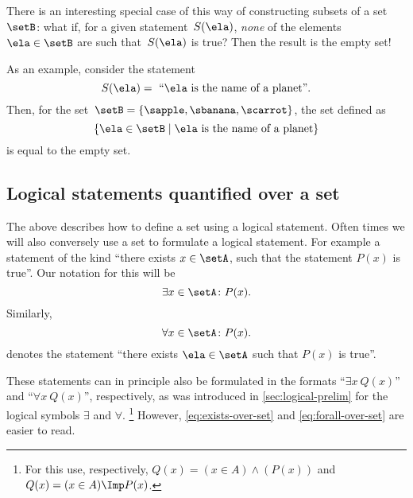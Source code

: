 There is an interesting special case of this way of constructing subsets of a set~$\setB$:
what if, for a given statement~$S(\ela)$, \emph{none} of the elements~$\ela \in \setB$ are such that~$S(\ela)$ is true?
Then the result is the empty set!

As an example, consider the statement
%
\begin{equation*}
    S(\ela) =\text{ ``} \ela \text{ is the name of a planet''}.
\end{equation*}
%
Then, for the set~$\setB = \{ \sapple, \sbanana, \scarrot \}$, the set defined as 
\begin{equation*}
    \{ \ela \in \setB \mid \ela \text{ is the name of a planet} \} 
\end{equation*}
is equal to the empty set. 

\subsection{Logical statements quantified over a set}

The above describes how to define a set using a logical statement.
Often times we will also conversely use a set to formulate a logical statement.
For example a statement of the kind ``there exists $x \in \setA$, such that the statement $P(x)$ is true''.
Our notation for this will be
\begin{equation}\label{eq:exists-over-set}
    \exists x \in \setA \colon P(x).
\end{equation}
Similarly,
\begin{equation}\label{eq:forall-over-set}
    \forall x \in \setA \colon P(x).
\end{equation}
denotes the statement ``there exists $\ela \in \setA$ such that $P(x)$ is true''.

These statements can in principle also be formulated in the formats ``$\exists x \ Q(x)$'' and ``$\forall x \ Q(x)$'', respectively, as was introduced in \cref{sec:logical-prelim} for the logical symbols $\exists$ and $\forall$.
\footnote{For this use, respectively, $Q(x) = (x \in A) \wedge (P(x))$ and $Q(x) = (x \in A) \Imp P(x)$.}
However, \cref{eq:exists-over-set} and \cref{eq:forall-over-set} are easier to read.

